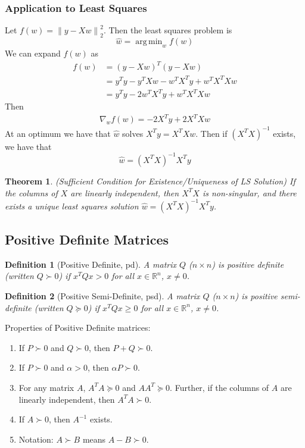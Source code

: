 \documentclass[12pt]{article}
\newtheorem{theorem}{Theorem}
\newtheorem{definition}{Definition}
\theoremstyle{definition}
\DeclareMathOperator*{\argmin}{arg\,min}
\newcommand{\R}{\mathbb{R}}
\newcommand{\norm}[1]{\left\lVert#1\right\rVert}
\begin{document}
\subsubsection{Application to Least Squares}
Let $f(w) = \norm{y - Xw}_2^2$. Then the least squares problem is 
\begin{equation}
	\hat{w} = \argmin_w f(w)
\end{equation}
We can expand $f(w)$ as
\begin{align*}
	f(w) &= (y - Xw)^T(y - Xw) \\
	&= y^T y - y^T X w - w^T X^T y + w^T X^T X w \\
	&= y^T y - 2 w^T X^T y + w^T X^T X w
\end{align*}
Then
\begin{align*}
	\nabla_w f(w) = -2 X^T y + 2 X^T X w
\end{align*}
At an optimum we have that $\hat{w}$ solves $X^T y = X^T X w$. Then if $(X^T X)^{-1}$ exists, we have that
\begin{equation}
	\hat{w} = (X^T X)^{-1} X^T y
\end{equation}

\begin{theorem}(Sufficient Condition for Existence/Uniqueness of LS Solution)
If the columns of $X$ are linearly independent, then $X^T X$ is non-singular, and there exists a unique least squares solution $\hat{w} = (X^T X)^{-1} X^T y$.
\end{theorem}

\subsection{Positive Definite Matrices}
\begin{definition}[Positive Definite, pd]
A matrix $Q$ ($n \times n$) is positive definite (written $Q \succ 0$) if $x^T Q x > 0$ for all $x \in \R^n$, $x \neq 0$. 
\end{definition}

\begin{definition}[Positive Semi-Definite, psd]
A matrix $Q$ ($n \times n$) is positive semi-definite (written $Q \succeq 0$) if $x^T Q x \geq 0$ for all $x \in \R^n$, $x \neq 0$. 
\end{definition}

Properties of Positive Definite matrices:
\begin{enumerate}
	\item If $P \succ 0$ and $Q \succ 0$, then $P+Q \succ 0$.
	\item If $P \succ 0$ and $\alpha > 0$, then $\alpha P \succ 0$.
	\item For any matrix $A$, $A^T A \succeq 0$ and $AA^T \succeq 0$. Further, if the columns of $A$ are linearly independent, then $A^T A \succ 0$.
	\item If $A \succ 0$, then $A^{-1}$ exists.
	\item Notation: $A \succ B$ means $A - B \succ 0$.
\end{enumerate}
\end{document}
